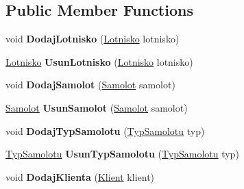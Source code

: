 \subsection*{Public Member Functions}
\begin{DoxyCompactItemize}
\item 
\mbox{\label{class_silnik_1_1_serwer_glowny_a038bee5f4bf55a8b7c3f17f6f6fd2035}} 
void {\bfseries Dodaj\+Lotnisko} (\mbox{\hyperlink{class_silnik_1_1_lotnisko}{Lotnisko}} lotnisko)
\item 
\mbox{\label{class_silnik_1_1_serwer_glowny_ac38b46d362c1752d3ec4e83b9cbbf6fe}} 
\mbox{\hyperlink{class_silnik_1_1_lotnisko}{Lotnisko}} {\bfseries Usun\+Lotnisko} (\mbox{\hyperlink{class_silnik_1_1_lotnisko}{Lotnisko}} lotnisko)
\item 
\mbox{\label{class_silnik_1_1_serwer_glowny_a06a06b9eddac04e072a2e22f3bf9c529}} 
void {\bfseries Dodaj\+Samolot} (\mbox{\hyperlink{class_silnik_1_1_samolot}{Samolot}} samolot)
\item 
\mbox{\label{class_silnik_1_1_serwer_glowny_ac5eb09af8456690ad86dbe5c59c78009}} 
\mbox{\hyperlink{class_silnik_1_1_samolot}{Samolot}} {\bfseries Usun\+Samolot} (\mbox{\hyperlink{class_silnik_1_1_samolot}{Samolot}} samolot)
\item 
\mbox{\label{class_silnik_1_1_serwer_glowny_a629fc578538155145b6e59799a532df0}} 
void {\bfseries Dodaj\+Typ\+Samolotu} (\mbox{\hyperlink{class_silnik_1_1_models_1_1_typ_samolotu}{Typ\+Samolotu}} typ)
\item 
\mbox{\label{class_silnik_1_1_serwer_glowny_a28abc6ed1ecc582ecdf336edc6cfcfc5}} 
\mbox{\hyperlink{class_silnik_1_1_models_1_1_typ_samolotu}{Typ\+Samolotu}} {\bfseries Usun\+Typ\+Samolotu} (\mbox{\hyperlink{class_silnik_1_1_models_1_1_typ_samolotu}{Typ\+Samolotu}} typ)
\item 
\mbox{\label{class_silnik_1_1_serwer_glowny_afeabd8724c1c381de58880b1d1fb27f4}} 
void {\bfseries Dodaj\+Klienta} (\mbox{\hyperlink{class_silnik_1_1_klient}{Klient}} klient)
\item 

\end{DoxyCompactItemize}
